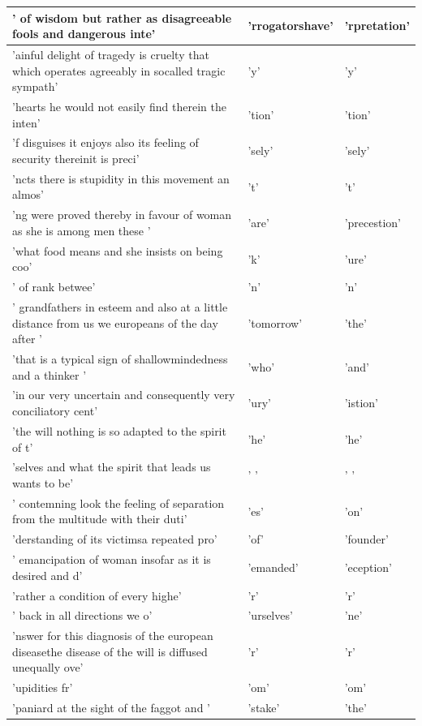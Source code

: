 \documentclass[11pt,a4paper,bibliography=totocnumbered,listof=totocnumbered]{scrartcl}
\begin{document}
\begin{table}[H]
\begin{tabularx}{\textwidth}{X|X|X}
\hline 
' of wisdom but rather as disagreeable fools and dangerous inte' & 'rrogatorshave' & 'rpretation' \\ 
\hline 
'ainful delight of tragedy is cruelty that which operates agreeably in socalled tragic sympath' & 'y' & 'y' \\ 
\hline 
'hearts he would not easily find therein the inten' & 'tion' & 'tion' \\ 
\hline 
'f disguises it enjoys also its feeling of security thereinit is preci' & 'sely' & 'sely' \\ 
\hline 
'ncts there is stupidity in this movement an almos' & 't' & 't' \\ 
\hline 
'ng were proved thereby in favour of woman as she is among men these ' & 'are' & 'precestion' \\ 
\hline 
'what food means and she insists on being coo' & 'k' & 'ure' \\ 
\hline 
' of rank betwee' & 'n' & 'n' \\ 
\hline 
' grandfathers in esteem and also at a little distance from us we europeans of the day after ' & 'tomorrow' & 'the' \\ 
\hline 
'that is a typical sign of shallowmindedness and a thinker ' & 'who' & 'and' \\ 
\hline 
'in our very uncertain and consequently very conciliatory cent' & 'ury' & 'istion' \\ 
\hline 
'the will nothing is so adapted to the spirit of t' & 'he' & 'he' \\ 
\hline 
'selves and what the spirit that leads us wants to be' & ' ' & ' ' \\ 
\hline 
' contemning look the feeling of separation from the multitude with their duti' & 'es' & 'on' \\ 
\hline 
'derstanding of its victimsa repeated pro' & 'of' & 'founder' \\ 
\hline 
' emancipation of woman insofar as it is desired and d' & 'emanded' & 'eception' \\ 
\hline 
'rather a condition of every highe' & 'r' & 'r' \\ 
\hline 
' back in all directions we o' & 'urselves' & 'ne' \\ 
\hline 
'nswer for this diagnosis of the european diseasethe disease of the will is diffused unequally ove' & 'r' & 'r' \\ 
\hline 
'upidities fr' & 'om' & 'om' \\ 
\hline 
'paniard at the sight of the faggot and ' & 'stake' & 'the' \\ 

\end{tabularx}
\end{table}
\end{document}
